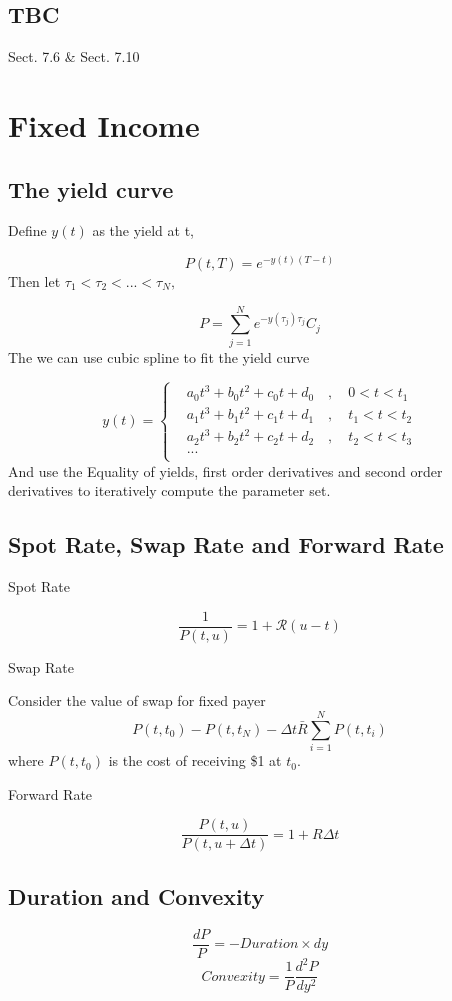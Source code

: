 \documentclass[a4]{article}
\begin{document}
\subsection{TBC}
Sect. 7.6 \& Sect. 7.10
\section{Fixed Income}
\subsection{The yield curve}
Define $y(t)$ as the yield at t,\par 
$$
P(t, T) = e^{-y(t)(T-t)}
$$
Then let $\tau_{1}<\tau_{2}<...<\tau_{N},$\par 
$$
P = \sum^{N}_{j=1}e^{-y(\tau_{j})\tau_{j}}C_{j}
$$
The we can use cubic spline to fit the yield curve\par 
$$
y(t) = \left\{
	\begin{aligned}
	&a_{0}t^{3} + b_{0}t^{2} + c_{0}t + d_{0}\quad ,\quad 0<t<t_{1}\\
	&a_{1}t^{3} + b_{1}t^{2} + c_{1}t + d_{1}\quad ,\quad t_{1}<t<t_{2}\\
		&a_{2}t^{3} + b_{2}t^{2} + c_{2}t + d_{2}\quad ,\quad t_{2}<t<t_{3}\\
		&...\\	
	\end{aligned}\right.
$$
And use the Equality of yields, first order derivatives and second order derivatives to iteratively compute the parameter set.
\subsection{Spot Rate, Swap Rate and Forward Rate}
\noindent Spot Rate\par 
$$
\dfrac{1}{P(t,u)} = 1 + \mathcal{R}(u-t)
$$\par 
\bigbreak 
\noindent Swap Rate\par 
Consider the value of swap for fixed payer
$$
P(t, t_{0}) - P(t, t_{N}) - \Delta t \bar R \sum^{N}_{i=1} P(t, t_{i})
$$
where $P(t,t_{0})$ is the cost of receiving \$1 at $t_{0}$.\par 
\bigbreak 
Forward Rate\par 
\bigbreak 
$$
\dfrac{P(t,u)}{P(t,u+\Delta t)} = 1 + R\Delta t
$$
\subsection{Duration and Convexity}
$$
\dfrac{dP}{P} =  -Duration\times dy
$$
$$
Convexity = \dfrac{1}{P}\dfrac{d^{2}P}{dy^{2}}
$$
\end{document}
